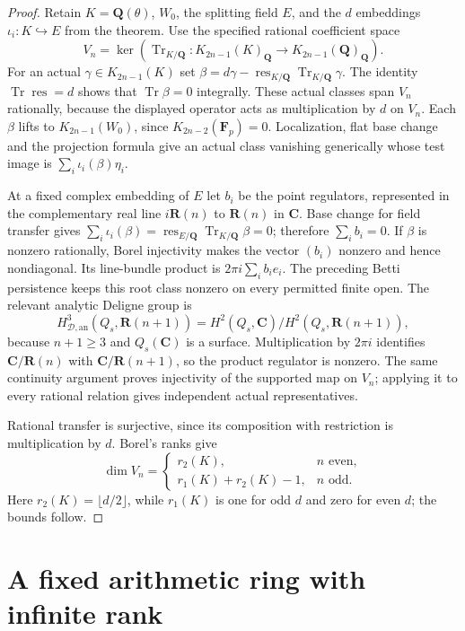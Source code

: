 \documentclass[11pt,a4paper]{amsart}
\numberwithin{equation}{section}
\theoremstyle{definition}
\theoremstyle{remark}
\newcommand{\Q}{\mathbf Q}
\newcommand{\R}{\mathbf R}
\newcommand{\C}{\mathbf C}
\newcommand{\F}{\mathbf F}
\begin{document}
\begin{proof}
Retain $K=\Q(\theta)$, $W_0$, the splitting field $E$, and the
$d$ embeddings $\iota_i:K\hookrightarrow E$ from the theorem.
Use the specified rational coefficient space
\[
 V_n=\ker\left(\operatorname{Tr}_{K/\Q}:
       K_{2n-1}(K)_{\Q}\longrightarrow K_{2n-1}(\Q)_{\Q}\right).
\]
For an actual $\gamma\in K_{2n-1}(K)$ set
$\beta=d\gamma-\operatorname{res}_{K/\Q}
                 \operatorname{Tr}_{K/\Q}\gamma$.
The identity $\operatorname{Tr}\operatorname{res}=d$ shows
that $\operatorname{Tr}\beta=0$ integrally. These actual
classes span $V_n$ rationally, because the displayed operator
acts as multiplication by $d$ on $V_n$.
Each $\beta$ lifts to $K_{2n-1}(W_0)$, since
$K_{2n-2}(\F_p)=0$. Localization, flat base change and the
projection formula give an actual class vanishing generically whose
test image is $\sum_i\iota_i(\beta)\eta_i$.

At a fixed complex embedding of $E$ let $b_i$ be the point
regulators, represented in the complementary real line
$i\R(n)$ to $\R(n)$ in $\C$. Base change for field transfer
gives $\sum_i\iota_i(\beta)=
\operatorname{res}_{E/\Q}\operatorname{Tr}_{K/\Q}\beta=0$;
therefore $\sum_i b_i=0$. If $\beta$ is nonzero rationally,
Borel injectivity \cite[Section~6]{BunkeTamme} makes the vector
$(b_i)$ nonzero and hence nondiagonal. Its line-bundle product is
$2\pi i\sum_i b_i e_i$. The preceding Betti persistence
keeps this root class nonzero on every permitted finite open.
The relevant analytic Deligne group is
\[
 H^3_{\mathcal D,\mathrm{an}}(Q_s,\R(n+1))
   =H^2(Q_s,\C)/H^2(Q_s,\R(n+1)),
\]
because $n+1\ge3$ and $Q_s(\C)$ is a surface.
Multiplication by $2\pi i$ identifies
$\C/\R(n)$ with $\C/\R(n+1)$, so the product regulator
is nonzero. The same continuity argument proves injectivity
of the supported map on $V_n$; applying it to every rational
relation gives independent actual representatives.

Rational transfer is surjective, since its composition with
restriction is multiplication by $d$. Borel's ranks
\cite[Proposition~12.2]{Borel} give
\[
 \dim V_n=
 \begin{cases}
 r_2(K),&n\text{ even},\\
 r_1(K)+r_2(K)-1,&n\text{ odd}.
 \end{cases}
\]
Here $r_2(K)=\lfloor d/2\rfloor$, while $r_1(K)$ is one for odd $d$ and zero for even $d$; the bounds follow.
\end{proof}

\section{A fixed arithmetic ring with infinite rank}
\label{d2ext:sec-strict-coefficients}
\end{document}
